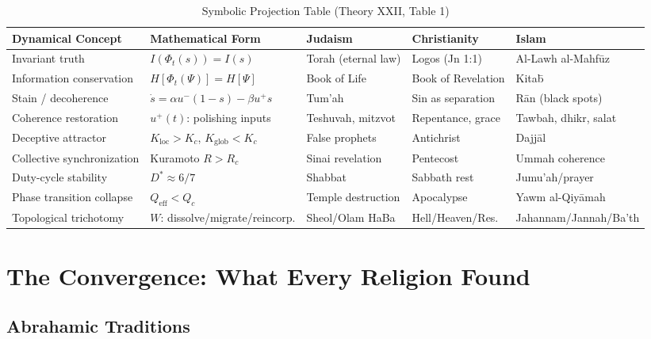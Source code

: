 \documentclass[12pt,oneside]{book}
\theoremstyle{definition}
\begin{document}
\begin{longtable}{@{}p{2.9cm}p{3.0cm}p{2.6cm}p{2.6cm}p{2.6cm}@{}}
  \caption{Symbolic Projection Table (Theory XXII, Table 1)}
  \label{tab:symbolic}\\
  \toprule
  \textbf{Dynamical Concept} & \textbf{Mathematical Form} &
  \textbf{Judaism} & \textbf{Christianity} & \textbf{Islam}\\
  \midrule\endfirsthead\midrule\endhead
  Invariant truth &
    $I(\Phi_t(s)) = I(s)$ &
    Torah (eternal law) &
    Logos (Jn 1:1) &
    Al-Lawh al-Mahf\={u}z\\
  Information conservation &
    $H[\Phi_t(\Psi)] = H[\Psi]$ &
    Book of Life &
    Book of Revelation &
    Kita\={b}\\
  Stain / decoherence &
    $\dot{s} = \alpha u^-(1-s) - \beta u^+s$ &
    Tum'ah &
    Sin as separation &
    R\={a}n (black spots)\\
  Coherence restoration &
    $u^+(t)$: polishing inputs &
    Teshuvah, mitzvot &
    Repentance, grace &
    Tawbah, dhikr, salat\\
  Deceptive attractor &
    $K_{\mathrm{loc}} > K_c$, $K_{\mathrm{glob}} < K_c$ &
    False prophets &
    Antichrist &
    Dajj\={a}l\\
  Collective synchronization &
    Kuramoto $R > R_c$ &
    Sinai revelation &
    Pentecost &
    Ummah coherence\\
  Duty-cycle stability &
    $D^* \approx 6/7$ &
    Shabbat &
    Sabbath rest &
    Jumu'ah/prayer\\
  Phase transition collapse &
    $Q_{\mathrm{eff}} < Q_c$ &
    Temple destruction &
    Apocalypse &
    Yawm al-Qiy\={a}mah\\
  Topological trichotomy &
    $W$: dissolve/migrate/reincorp. &
    Sheol/Olam HaBa &
    Hell/Heaven/Res. &
    Jahannam/Jannah/Ba'th\\
  \bottomrule
\end{longtable}

\part{The Convergence: What Every Religion Found}

\chapter{Abrahamic Traditions}
\label{chap:abrahamic}
\end{document}
